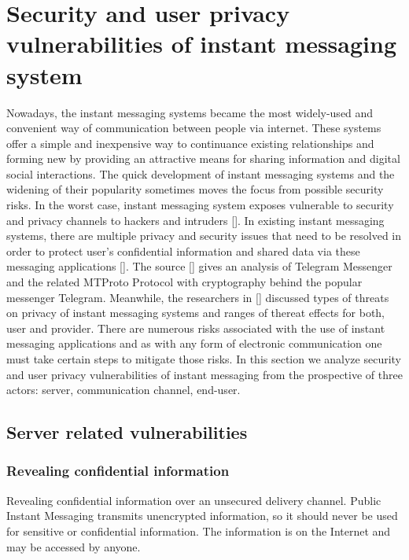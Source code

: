 \chapter{Security and user privacy vulnerabilities of instant messaging system}
\label{ch:security-and-user-privacy-vulnerabilities-of-instant-messaging-system}

Nowadays, the instant messaging systems became the most widely-used and convenient way of communication between
people via internet.
These systems offer a simple and inexpensive way to continuance existing relationships and forming new by providing an
attractive means for sharing information and digital social interactions.
The quick development of instant messaging systems and the widening of their popularity sometimes moves the
focus from possible security risks.
In the worst case, instant messaging system exposes vulnerable to security and privacy channels to hackers and intruders
[\cite{mcclure2009hacking, mannan2005secure}].
In existing instant messaging systems, there are multiple privacy and security issues that need to be resolved in order
to protect user's confidential information and shared data via these messaging applications [\cite{loesing2006privacy}].
The source [\cite{job2015modified}] gives an analysis of Telegram Messenger and the related MTProto Protocol with cryptography
behind the popular messenger Telegram.
Meanwhile, the researchers in [\cite{khan2015survey}] discussed types of threats on privacy of instant messaging systems
and ranges of thereat effects for both, user and provider.
There are numerous risks associated with the use of instant messaging applications and as with any form of
electronic communication one must take certain steps to mitigate those risks.
In this section we analyze security and user privacy vulnerabilities of instant messaging from the prospective of three
actors: server, communication channel, end-user.


\section{Server related vulnerabilities}\label{sec:server-vulnerabilities}

\subsection{Revealing confidential information}\label{subsec:revealing-confidential-information}
Revealing confidential information over an unsecured delivery channel.
Public Instant Messaging transmits unencrypted information, so it should never be used for sensitive or confidential
information.
The information is on the Internet and may be accessed by anyone.

